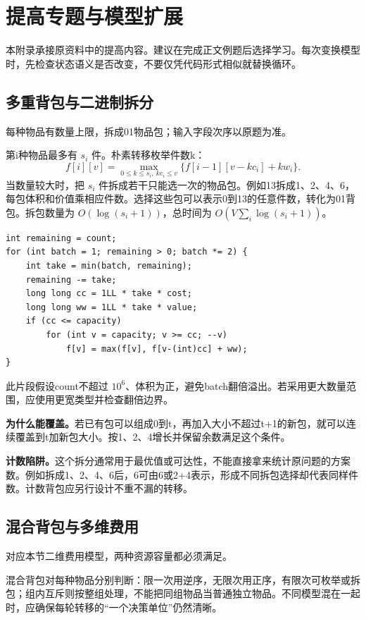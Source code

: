\appendix
\section{提高专题与模型扩展}
本附录承接原资料中的提高内容。建议在完成正文例题后选择学习。每次变换模型时，先检查状态语义是否改变，不要仅凭代码形式相似就替换循环。

\subsection{多重背包与二进制拆分}
每种物品有数量上限，拆成01物品包；输入字段次序以原题为准。

第i种物品最多有 $s_i$ 件。朴素转移枚举件数k：
\[f[i][v]=\max_{0\le k\le s_i,\ kc_i\le v}\{f[i-1][v-kc_i]+kw_i\}.\]
当数量较大时，把 $s_i$ 件拆成若干只能选一次的物品包。例如13拆成1、2、4、6，每包体积和价值乘相应件数。选择这些包可以表示0到13的任意件数，转化为01背包。拆包数量为 $O(\log(s_i+1))$，总时间为 $O(V\sum_i\log(s_i+1))$。

\begin{lstlisting}
int remaining = count;
for (int batch = 1; remaining > 0; batch *= 2) {
    int take = min(batch, remaining);
    remaining -= take;
    long long cc = 1LL * take * cost;
    long long ww = 1LL * take * value;
    if (cc <= capacity)
        for (int v = capacity; v >= cc; --v)
            f[v] = max(f[v], f[v-(int)cc] + ww);
}
\end{lstlisting}
此片段假设count不超过 $10^6$、体积为正，避免batch翻倍溢出。若采用更大数量范围，应使用更宽类型并检查翻倍边界。

\textbf{为什么能覆盖。}若已有包可以组成0到t，再加入大小不超过t+1的新包，就可以连续覆盖到t加新包大小。按1、2、4增长并保留余数满足这个条件。

\textbf{计数陷阱。}这个拆分通常用于最优值或可达性，不能直接拿来统计原问题的方案数。例如拆成1、2、4、6后，6可由6或2+4表示，形成不同拆包选择却代表同样件数。计数背包应另行设计不重不漏的转移。

\subsection{混合背包与多维费用}
对应本节二维费用模型，两种资源容量都必须满足。

混合背包对每种物品分别判断：限一次用逆序，无限次用正序，有限次可枚举或拆包；组内互斥则按整组处理，不能把同组物品当普通独立物品。不同模型混在一起时，应确保每轮转移的“一个决策单位”仍然清晰。

